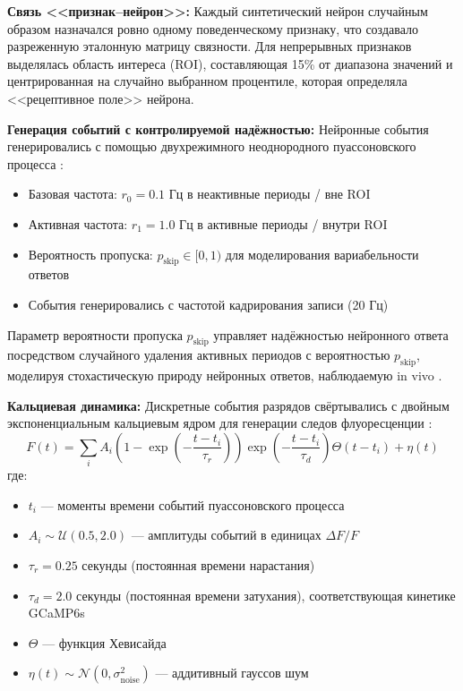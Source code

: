 \textbf{Связь <<признак--нейрон>>:} Каждый синтетический нейрон случайным образом назначался
ровно одному поведенческому признаку, что создавало разреженную эталонную матрицу связности.
Для непрерывных признаков выделялась область интереса (ROI), составляющая 15\% от
диапазона значений и центрированная на случайно выбранном процентиле, которая определяла <<рецептивное поле>> нейрона.

\textbf{Генерация событий с контролируемой надёжностью:} Нейронные события генерировались
с помощью двухрежимного неоднородного пуассоновского процесса \citep{Borst1999}:
\begin{itemize}
\item Базовая частота: $r_0 = 0.1$ Гц в неактивные периоды / вне ROI
\item Активная частота: $r_1 = 1.0$ Гц в активные периоды / внутри ROI
\item Вероятность пропуска: $p_{\text{skip}} \in [0, 1)$ для моделирования вариабельности ответов
\item События генерировались с частотой кадрирования записи (20 Гц)
\end{itemize}

Параметр вероятности пропуска $p_{\text{skip}}$ управляет надёжностью нейронного ответа
посредством случайного удаления активных периодов с вероятностью $p_{\text{skip}}$,
моделируя стохастическую природу нейронных ответов, наблюдаемую in vivo
\citep{Grijseels2021}.

\textbf{Кальциевая динамика:} Дискретные события разрядов свёртывались с
двойным экспоненциальным кальциевым ядром для генерации следов флуоресценции
\citep{Zhang2023}:
\begin{equation}
\label{eq:calcium_dynamics}
F(t) = \sum_i A_i \left(1 - \exp\!\left(-\frac{t - t_i}{\tau_r}\right)\right)
\exp\!\left(-\frac{t - t_i}{\tau_d}\right) \Theta(t - t_i) + \eta(t)
\end{equation}
где:
\begin{itemize}
\item $t_i$ --- моменты времени событий пуассоновского процесса
\item $A_i \sim \mathcal{U}(0.5, 2.0)$ --- амплитуды событий в единицах $\Delta F/F$
\item $\tau_r = 0.25$ секунды (постоянная времени нарастания)
\item $\tau_d = 2.0$ секунды (постоянная времени затухания), соответствующая кинетике GCaMP6s
\item $\Theta$ --- функция Хевисайда
\item $\eta(t) \sim \mathcal{N}(0, \sigma_{\text{noise}}^2)$ --- аддитивный гауссов шум
\end{itemize}

